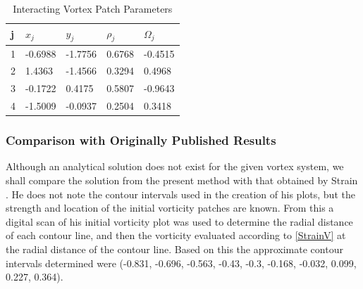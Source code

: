 \documentclass[]{aiaa-tc}%
\begin{document}
\begin{table}
\centering
\caption{Interacting Vortex Patch Parameters}\label{table:StrainTable}
\begin{tabular}{lllll}
\hline
j & $x_j$    & $y_j$    & $\rho_j$ & $\Omega_j$ \\ \hline
1 & -0.6988 & -1.7756 & 0.6768  & -0.4515   \\
2 & 1.4363  & -1.4566 & 0.3294  & 0.4968    \\
3 & -0.1722 & 0.4175  & 0.5807  & -0.9643   \\
4 & -1.5009 & -0.0937 & 0.2504  &  0.3418    \\ \hline
\end{tabular}
\end{table}

\subsubsection{Comparison with Originally Published Results}\label{SComp}
Although an analytical solution does not exist for the given vortex system, we shall compare the solution from the present method with that obtained by Strain \cite{Strain1996}. He does not note the contour intervals used in the creation of his plots, but the strength and location of the initial vorticity patches are known. From this a digital scan of his initial vorticity plot was used to determine the radial distance of each contour line, and then the vorticity evaluated according to \eqref{StrainV} at the radial distance of the contour line. Based on this the approximate contour intervals determined were (-0.831, -0.696, -0.563, -0.43, -0.3, -0.168, -0.032, 0.099, 0.227, 0.364).
\end{document}
